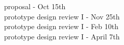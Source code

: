 proposal - Oct 15th\\
prototype design review I - Nov 25th\\
prototype design review I - Feb 10th\\
prototype design review I - April 7th\\
